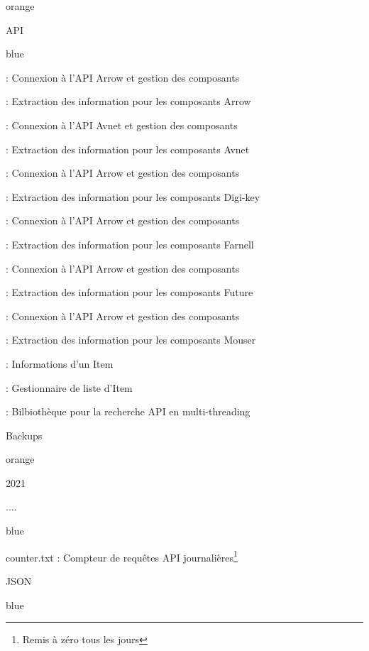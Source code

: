 \begin{items}{orange}{\Triangle}
\item API
\begin{items}{blue}{\Triangle}
\item {} : Connexion à l'API Arrow et gestion des composants
\item {} : Extraction des information pour les composants Arrow
\item {} : Connexion à l'API Avnet et gestion des composants
\item {} : Extraction des information pour les composants Avnet
\item {} : Connexion à l'API Arrow et gestion des composants
\item {} : Extraction des information pour les composants Digi-key
\item {} : Connexion à l'API Arrow et gestion des composants
\item {} : Extraction des information pour les composants Farnell
\item {} : Connexion à l'API Arrow et gestion des composants
\item {} : Extraction des information pour les composants Future
\item {} : Connexion à l'API Arrow et gestion des composants
\item {} : Extraction des information pour les composants Mouser
\item {} : Informations d'un Item
\item {} : Gestionnaire de liste d'Item
\item {} : Bilbiothèque pour la recherche API en multi-threading
\end{items}
\item Backups
\begin{items}{orange}{\Triangle}
\item 2021
\item ....
\end{items}
\begin{items}{blue}{\Triangle}
\item counter.txt : Compteur de requêtes API  journalières\footnote{Remis à zéro tous les jours}
\end{items}
\item JSON
\begin{items}{blue}{\Triangle}

\end{items}
\end{items}
